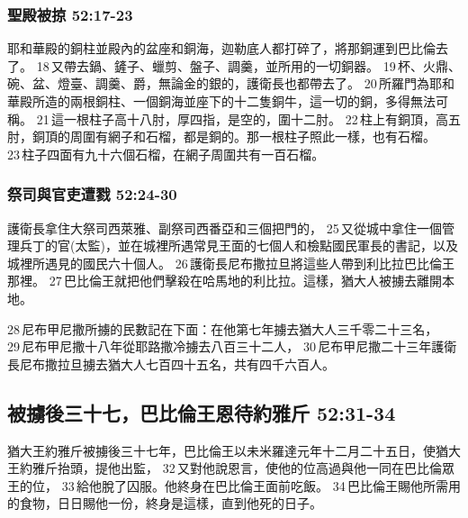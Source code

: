 \subsubsection{聖殿被掠 52:17-23}
耶和華殿的銅柱並殿內的盆座和銅海，迦勒底人都打碎了，將那銅運到巴比倫去了。 18 又帶去鍋、鏟子、蠟剪、盤子、調羹，並所用的一切銅器。 19 杯、火鼎、碗、盆、燈臺、調羹、爵，無論金的銀的，護衛長也都帶去了。 20 所羅門為耶和華殿所造的兩根銅柱、一個銅海並座下的十二隻銅牛，這一切的銅，多得無法可稱。 21 這一根柱子高十八肘，厚四指，是空的，圍十二肘。 22 柱上有銅頂，高五肘，銅頂的周圍有網子和石榴，都是銅的。那一根柱子照此一樣，也有石榴。 23 柱子四面有九十六個石榴，在網子周圍共有一百石榴。

\subsubsection{祭司與官吏遭戮 52:24-30}
護衛長拿住大祭司西萊雅、副祭司西番亞和三個把門的， 25 又從城中拿住一個管理兵丁的官(太監)，並在城裡所遇常見王面的七個人和檢點國民軍長的書記，以及城裡所遇見的國民六十個人。 26 護衛長尼布撒拉旦將這些人帶到利比拉巴比倫王那裡。 27 巴比倫王就把他們擊殺在哈馬地的利比拉。這樣，猶大人被擄去離開本地。

28 尼布甲尼撒所擄的民數記在下面：在他第七年擄去猶大人三千零二十三名， 29 尼布甲尼撒十八年從耶路撒冷擄去八百三十二人， 30 尼布甲尼撒二十三年護衛長尼布撒拉旦擄去猶大人七百四十五名，共有四千六百人。

\subsection{被擄後三十七，巴比倫王恩待約雅斤 52:31-34}
猶大王約雅斤被擄後三十七年，巴比倫王以未米羅達元年十二月二十五日，使猶大王約雅斤抬頭，提他出監， 32 又對他說恩言，使他的位高過與他一同在巴比倫眾王的位， 33 給他脫了囚服。他終身在巴比倫王面前吃飯。 34 巴比倫王賜他所需用的食物，日日賜他一份，終身是這樣，直到他死的日子。







